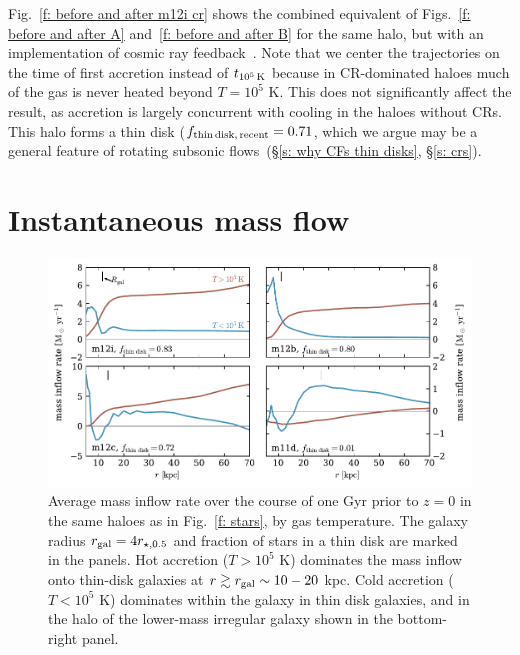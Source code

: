 \documentclass[fleqn,usenatbib]{mnras}
\newcommand{\fthin}{f_{\rm thin\,disk,\,recent}}
\newcommand{\tcools}{t_{10^5\,{\rm K}}}
\begin{document}
Fig.~\ref{f: before and after m12i cr} shows the combined equivalent of Figs.~\ref{f: before and after A} and~\ref{f: before and after B} for the same halo, but with an implementation of cosmic ray feedback~\cite{Chan2019, Hopkins2020a}.
Note that we center the trajectories on the time of first accretion instead of $\tcools$ because in CR-dominated haloes much of the gas is never heated beyond $T = 10^5$ K.
This does not significantly affect the result, as accretion is largely concurrent with cooling in the haloes without CRs.
This halo forms a thin disk ($\fthin=0.71$, which we argue may be a general feature of rotating subsonic flows~(\S\ref{s: why CFs thin disks}, \S\ref{s: crs}).

\section{Instantaneous mass flow}
\label{s: appendix-mass flow}

\begin{figure}
    \centering
    \includegraphics{figures/Mdot.pdf}
    \caption{
    Average mass inflow rate over the course of one Gyr prior to $z=0$ in the same haloes as in Fig.~\ref{f: stars}, by gas temperature.
    The galaxy radius $r_{\rm gal}=4 r_{\star,0.5}$ and fraction of stars in a thin disk are marked in the panels. 
    Hot accretion ($T>10^5$ K) dominates the mass inflow onto thin-disk galaxies at $r \gtrsim r_{\rm gal} \sim 10-20$ kpc.
    Cold accretion ($T<10^5$ K) dominates within the galaxy in thin disk galaxies, and in the halo of the lower-mass irregular galaxy shown in the bottom-right panel.
    }
    \label{f: Mdot}
\end{figure}
\end{document}
